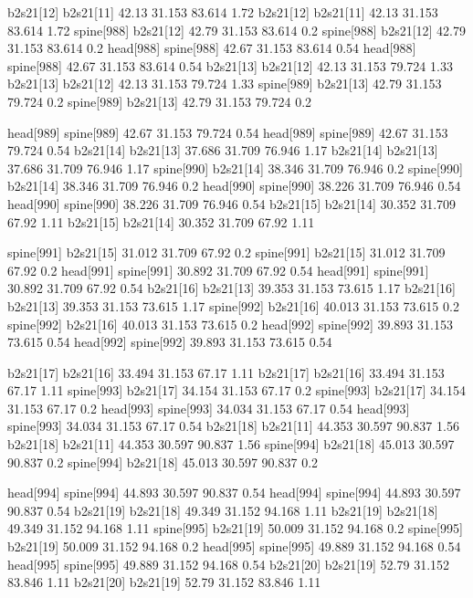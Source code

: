 b2s21[12]    b2s21[11]    42.13    31.153    83.614    1.72
b2s21[12]    b2s21[11]    42.13    31.153    83.614    1.72
spine[988]    b2s21[12]    42.79    31.153    83.614    0.2
spine[988]    b2s21[12]    42.79    31.153    83.614    0.2
head[988]    spine[988]    42.67    31.153    83.614    0.54
head[988]    spine[988]    42.67    31.153    83.614    0.54
b2s21[13]    b2s21[12]    42.13    31.153    79.724    1.33
b2s21[13]    b2s21[12]    42.13    31.153    79.724    1.33
spine[989]    b2s21[13]    42.79    31.153    79.724    0.2
spine[989]    b2s21[13]    42.79    31.153    79.724    0.2


head[989]    spine[989]    42.67    31.153    79.724    0.54
head[989]    spine[989]    42.67    31.153    79.724    0.54
b2s21[14]    b2s21[13]    37.686    31.709    76.946    1.17
b2s21[14]    b2s21[13]    37.686    31.709    76.946    1.17
spine[990]    b2s21[14]    38.346    31.709    76.946    0.2
spine[990]    b2s21[14]    38.346    31.709    76.946    0.2
head[990]    spine[990]    38.226    31.709    76.946    0.54
head[990]    spine[990]    38.226    31.709    76.946    0.54
b2s21[15]    b2s21[14]    30.352    31.709    67.92    1.11
b2s21[15]    b2s21[14]    30.352    31.709    67.92    1.11


spine[991]    b2s21[15]    31.012    31.709    67.92    0.2
spine[991]    b2s21[15]    31.012    31.709    67.92    0.2
head[991]    spine[991]    30.892    31.709    67.92    0.54
head[991]    spine[991]    30.892    31.709    67.92    0.54
b2s21[16]    b2s21[13]    39.353    31.153    73.615    1.17
b2s21[16]    b2s21[13]    39.353    31.153    73.615    1.17
spine[992]    b2s21[16]    40.013    31.153    73.615    0.2
spine[992]    b2s21[16]    40.013    31.153    73.615    0.2
head[992]    spine[992]    39.893    31.153    73.615    0.54
head[992]    spine[992]    39.893    31.153    73.615    0.54


b2s21[17]    b2s21[16]    33.494    31.153    67.17    1.11
b2s21[17]    b2s21[16]    33.494    31.153    67.17    1.11
spine[993]    b2s21[17]    34.154    31.153    67.17    0.2
spine[993]    b2s21[17]    34.154    31.153    67.17    0.2
head[993]    spine[993]    34.034    31.153    67.17    0.54
head[993]    spine[993]    34.034    31.153    67.17    0.54
b2s21[18]    b2s21[11]    44.353    30.597    90.837    1.56
b2s21[18]    b2s21[11]    44.353    30.597    90.837    1.56
spine[994]    b2s21[18]    45.013    30.597    90.837    0.2
spine[994]    b2s21[18]    45.013    30.597    90.837    0.2


head[994]    spine[994]    44.893    30.597    90.837    0.54
head[994]    spine[994]    44.893    30.597    90.837    0.54
b2s21[19]    b2s21[18]    49.349    31.152    94.168    1.11
b2s21[19]    b2s21[18]    49.349    31.152    94.168    1.11
spine[995]    b2s21[19]    50.009    31.152    94.168    0.2
spine[995]    b2s21[19]    50.009    31.152    94.168    0.2
head[995]    spine[995]    49.889    31.152    94.168    0.54
head[995]    spine[995]    49.889    31.152    94.168    0.54
b2s21[20]    b2s21[19]    52.79    31.152    83.846    1.11
b2s21[20]    b2s21[19]    52.79    31.152    83.846    1.11



